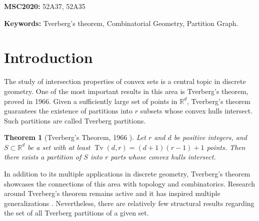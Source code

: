 \documentclass[11pt,a4paper]{article}
\theoremstyle{plain}
\newtheorem{theorem}{Theorem}[section]
\theoremstyle{definition}
\newtheorem{conjecture}{Conjecture}
\newtheorem{problem}{Problem}
\newcommand{\rr}{\mathds{R}}
\newcommand{\tv}{\operatorname{Tv}}
\begin{document}




\textbf{MSC2020:} 52A37, 52A35

\textbf{Keywords:} Tverberg's theorem, Combinatorial Geometry, Partition Graph.

\section{Introduction}

The study of intersection properties of convex sets is a central topic in discrete geometry.  One of the most important results in this area is Tverberg's theorem, proved in 1966.  Given a sufficiently large set of points in $\rr^d$, Tverberg's theorem guarantees the existence of partitions into $r$ subsets whose convex hulls intersect.  Such partitions are called Tverberg partitions.

\begin{theorem}[Tverberg's Theorem, 1966 \cite{tverberg1966generalization}]
Let $r$ and $d$ be positive integers, and $S\subset \rr^d$ be a set with at least ${\tv(d,r)=(d + 1)(r - 1) + 1}$ points. Then there exists a partition of $S$ into $r$ parts whose convex hulls intersect.
\end{theorem}

In addition to its multiple applications in discrete geometry, Tverberg's theorem showcases the connections of this area with topology and combinatorics.  Research around Tverberg's theorem remains active and it has inspired multiple generalizations \cite{Barany:2018fy, de2019discrete}. Nevertheless, there are relatively few structural results regarding the set of all Tverberg partitions of a given set.  
\end{document}
